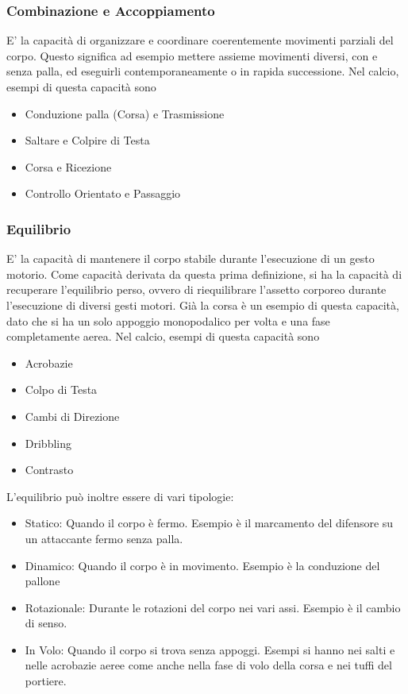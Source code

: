 \documentclass[../uefaC.tex]{subfiles}
\begin{document}
\subsubsection{Combinazione e Accoppiamento}

E' la capacità di organizzare e coordinare coerentemente movimenti parziali del corpo. Questo significa ad esempio mettere assieme movimenti diversi, con e senza palla, ed eseguirli contemporaneamente o in rapida successione.
Nel calcio, esempi di questa capacità sono
\begin{itemize}
    \item Conduzione palla (Corsa) e Trasmissione
    \item Saltare e Colpire di Testa
    \item Corsa e Ricezione
    \item Controllo Orientato e Passaggio
\end{itemize}

\subsubsection{Equilibrio}

E' la capacità di mantenere il corpo stabile durante l'esecuzione di un gesto motorio. Come capacità derivata da questa prima definizione, si ha la capacità di recuperare l'equilibrio perso, ovvero di riequilibrare l'assetto corporeo durante l'esecuzione di diversi gesti motori.
Già la corsa è un esempio di questa capacità, dato che si ha un solo appoggio monopodalico per volta e una fase completamente aerea. Nel calcio, esempi di questa capacità sono
\begin{itemize}
    \item Acrobazie
    \item Colpo di Testa
    \item Cambi di Direzione
    \item Dribbling
    \item Contrasto
\end{itemize}
L'equilibrio può inoltre essere di vari tipologie:
\begin{itemize}
    \item{Statico}: Quando il corpo è fermo. Esempio è il marcamento del difensore su un attaccante fermo senza palla.
    \item{Dinamico}: Quando il corpo è in movimento. Esempio è la conduzione del pallone
    \item{Rotazionale}: Durante le rotazioni del corpo nei vari assi. Esempio è il cambio di senso.
    \item{In Volo}: Quando il corpo si trova senza appoggi. Esempi si hanno nei salti e nelle acrobazie aeree come anche nella fase di volo della corsa e nei tuffi del portiere.
\end{itemize}
\end{document}
